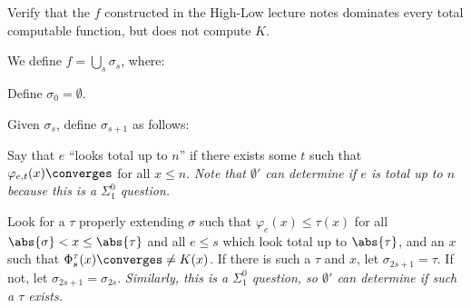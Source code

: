 \begin{problem}
  Verify that the $f$ constructed in the High-Low lecture
  notes dominates every total computable function, but does not
  compute $K$.

  \begin{answer}
    We define $\displaystyle f = \bigcup_s \sigma_s$, where:
    \begin{enumarabic}
      \item Define $\sigma_0 = \emptyset$.
      \item Given $\sigma_s$, define $\sigma_{s + 1}$ as follows:
        \begin{enumalph}
          \item Say that $e$ ``looks total up to $n$'' if there exists some $t$
            such that $\varphi_{e, t}(x) \converges$ for all $x \leq n$.
            \emph{
              Note that $\emptyset'$ can determine if $e$ is total up to $n$
              because this is a $\Sigma^0_1$ question.
            }
          \item Look for a $\tau$ properly extending $\sigma$
            such that $\varphi_e(x) \leq \tau(x)$ for all
            $\abs{\sigma} < x \leq \abs{\tau}$ and all $e \leq s$
            which look total up to $\abs{\tau}$, and an $x$ such that
            $\Phi^\tau_s(x) \converges \neq K(x)$.
            If there is such a $\tau$ and $x$, let $\sigma_{2s + 1} = \tau$.
            If not, let $\sigma_{2s + 1} = \sigma_{2s}$.
            \emph{
              Similarly, this is a $\Sigma^0_1$ question,
              so $\emptyset'$ can determine if such a $\tau$ exists.
            }
        \end{enumalph}
    \end{enumarabic}


\end{answer}
\end{problem}
